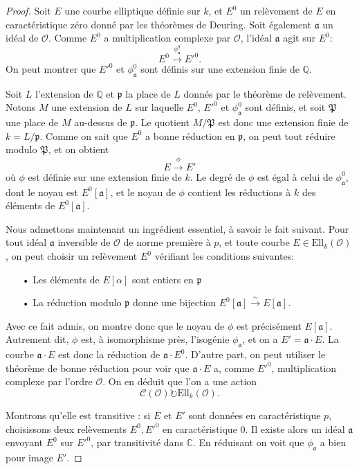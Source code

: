 \documentclass[11pt,a4paper]{article}
\newcommand{\C}{\mathbb{C}}
\newcommand{\Q}{\mathbb{Q}}
\renewcommand{\O}{\mathcal{O}}
\newcommand{\Cl}{\mathcal{C}}
\newcommand{\vers}{\longrightarrow}
\newcommand{\Ell}{\mathrm{Ell}}
\renewcommand{\frak}{\mathfrak}
\theoremstyle{definition}
\begin{document}
\begin{proof}

Soit $E$ une courbe elliptique définie sur $k$, et $E^0$ un relèvement de $E$ en caractéristique zéro donné par les théorèmes de Deuring. Soit également $\frak a$ un idéal de $\O$. Comme $E^0$ a multiplication complexe par $\O$, l'idéal $\frak a$ agit sur $E^0$:
$$E^0 \overset{\phi_{\frak a}^0}{\vers} E'^0.$$
On peut montrer que $E'^0$ et $\phi_{\frak a}^0$ sont définis sur une extension finie de $\Q$.

Soit $L$ l'extension de $\Q$ et $\frak p$ la place de $L$ donnés par le théorème de relèvement. Notons $M$ une extension de $L$ sur laquelle $E^0$, $E'^0$ et $\phi_{\frak a}^0$ sont définis, et soit $\frak P$ une place de $M$ au-dessus de $\frak p$. Le quotient $M/\frak P$ est donc une extension finie de $k = L/\frak p$. Comme on sait que $E^0$ a bonne réduction en $\frak p$, on peut tout réduire modulo $\frak P$, et on obtient
$$E \overset{\phi}{\vers} E'$$
où $\phi$ est définie sur une extension finie de $k$. Le degré de $\phi$ est égal à celui de $\phi_{\frak a}^0$, dont le noyau est $E^0[\frak a]$, et le noyau de $\phi$ contient les réductions à $k$ des éléments de $E^0[\frak a]$. 

Nous admettons maintenant un ingrédient essentiel, à savoir le fait suivant. Pour tout idéal $\frak a$ inversible de $\O$ de norme première à $p$, et toute courbe $E\in \Ell_k(\O)$, on peut choisir un relèvement $E^0$ vérifiant les conditions suivantes:
\begin{itemize}
\item[•] Les éléments de $E[\alpha]$ sont entiers en $\frak p$
\item[•] La réduction modulo $\frak p$ donne une bijection $E^0[\frak a] \overset{\sim}{\to} E[\frak a]$.
\end{itemize}

Avec ce fait admis, on montre donc que le noyau de $\phi$ est précisément $E[\frak a]$. Autrement dit, $\phi$ est, à isomorphisme près, l'isogénie $\phi_{\frak a}$, et on a $E' = \frak a\cdot E$. La courbe $\frak a\cdot E$ est donc la réduction de $\frak a\cdot E^0$. D'autre part, on peut utiliser le théorème de bonne réduction pour voir que $\frak a\cdot E$ a, comme $E'^0$, multiplication complexe par l'ordre $\O$. On en déduit que l'on a une action
$$\Cl(\O) \circlearrowright \Ell_k(\O).$$

Montrons qu'elle est transitive : si $E$ et $E'$ sont données en caractéristique $p$, choisissons deux relèvements $E^0, E'^0$ en caractéristique 0. Il existe alors un idéal $\frak a$ envoyant $E^0$ sur $E'^0$, par transitivité dans $\C$. En réduisant on voit que $\phi_{\frak a}$ a bien pour image $E'$.


\end{proof}
\end{document}
